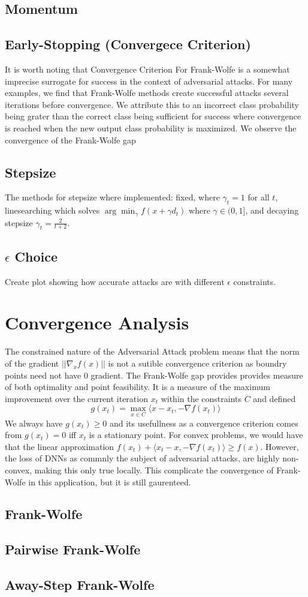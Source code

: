 \documentclass{article}
\begin{document}
\subsection{Momentum}
\subsection{Early-Stopping (Convergece Criterion)}
It is worth noting that Convergence Criterion For Frank-Wolfe is a somewhat imprecise surrogate for success in the context of adversarial attacks. For many examples, we find that Frank-Wolfe methods create successful attacks several iterations before convergence. We attribute this to an incorrect class probability being grater than the correct class being sufficient for success where convergence is reached when the new output class probability is maximized. 
We observe the convergence of the Frank-Wolfe gap 
\subsection{Stepsize}
The methods for stepsize where implemented: fixed, where $\gamma_t = 1$ for all $t$, linesearching which solves $\arg \min _\gamma f(x + \gamma d_t)$ where $\gamma \in (0,1]$, and decaying stepsize $\gamma_t = \frac{2}{t + 2}$.
\subsection{$\epsilon$ Choice}
Create plot showing how accurate attacks are with different $\epsilon$ constraints.
\section{Convergence Analysis}
The constrained nature of the Adversarial Attack problem means that the norm of the gradient $||\nabla_x f(x)||$ is not a sutible convergence criterion as boundry points need not have $0$ gradient. 
The Frank-Wolfe gap provides provides measure of both optimality and point feasibility. It is a measure of the maximum improvement over the current iteration $x_t$ within the constraints $C$ and defined
$$g(x_t) = \max_{x\in C} \langle x - x_t, -\nabla f(x_t)\rangle$$
We always have $g(x_t) \geq 0$ and its usefullness as a convergence criterion comes from $g(x_t) = 0$ iff $x_t$ is a stationary point. 
For convex problems, we would have that the linear approximation $f(x_t) + \langle x_t - x, -\nabla f(x_t) \rangle \geq f(x)$. However, the loss of DNNs as commnly the subject of adversarial attacks, are highly non-convex, making this only true locally. This complicate the convergence of Frank-Wolfe in this application, but it is still gaurenteed.

\subsection{Frank-Wolfe}
\subsection{Pairwise Frank-Wolfe}
\subsection{Away-Step Frank-Wolfe}
\end{document}
